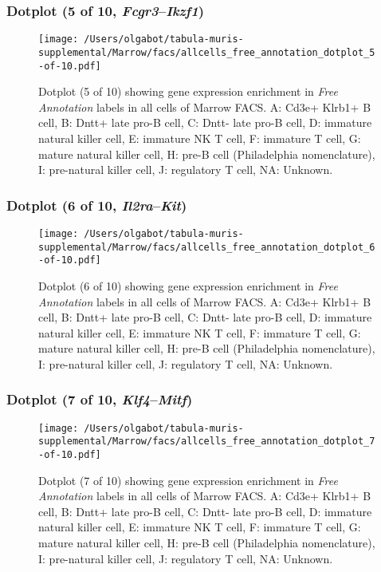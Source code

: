\clearpage

\subsubsection{Dotplot (5 of 10, \emph{Fcgr3}--\emph{Ikzf1})}
\begin{figure}[h]
\centering
\texttt{[image: /Users/olgabot/tabula-muris-supplemental/Marrow/facs/allcells\_free\_annotation\_dotplot\_5-of-10.pdf]}

\caption{ Dotplot (5 of 10)  showing gene expression enrichment in \emph{Free Annotation} labels in all cells of Marrow FACS. A: Cd3e+ Klrb1+ B cell, B: Dntt+ late pro-B cell, C: Dntt- late pro-B cell, D: immature natural killer cell, E: immature NK T cell, F: immature T cell, G: mature natural killer cell, H: pre-B cell (Philadelphia nomenclature), I: pre-natural killer cell, J: regulatory T cell, NA: Unknown.}
\end{figure}


\clearpage

\subsubsection{Dotplot (6 of 10, \emph{Il2ra}--\emph{Kit})}
\begin{figure}[h]
\centering
\texttt{[image: /Users/olgabot/tabula-muris-supplemental/Marrow/facs/allcells\_free\_annotation\_dotplot\_6-of-10.pdf]}

\caption{ Dotplot (6 of 10)  showing gene expression enrichment in \emph{Free Annotation} labels in all cells of Marrow FACS. A: Cd3e+ Klrb1+ B cell, B: Dntt+ late pro-B cell, C: Dntt- late pro-B cell, D: immature natural killer cell, E: immature NK T cell, F: immature T cell, G: mature natural killer cell, H: pre-B cell (Philadelphia nomenclature), I: pre-natural killer cell, J: regulatory T cell, NA: Unknown.}
\end{figure}


\clearpage

\subsubsection{Dotplot (7 of 10, \emph{Klf4}--\emph{Mitf})}
\begin{figure}[h]
\centering
\texttt{[image: /Users/olgabot/tabula-muris-supplemental/Marrow/facs/allcells\_free\_annotation\_dotplot\_7-of-10.pdf]}

\caption{ Dotplot (7 of 10)  showing gene expression enrichment in \emph{Free Annotation} labels in all cells of Marrow FACS. A: Cd3e+ Klrb1+ B cell, B: Dntt+ late pro-B cell, C: Dntt- late pro-B cell, D: immature natural killer cell, E: immature NK T cell, F: immature T cell, G: mature natural killer cell, H: pre-B cell (Philadelphia nomenclature), I: pre-natural killer cell, J: regulatory T cell, NA: Unknown.}
\end{figure}


